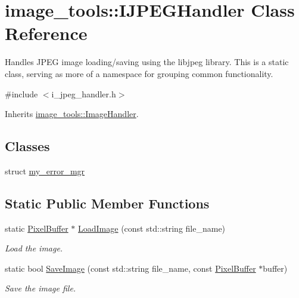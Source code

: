 \hypertarget{classimage__tools_1_1IJPEGHandler}{}\section{image\+\_\+tools\+:\+:I\+J\+P\+E\+G\+Handler Class Reference}
\label{classimage__tools_1_1IJPEGHandler}


Handles J\+P\+EG image loading/saving using the libjpeg library. This is a static class, serving as more of a namespace for grouping common functionality.  




{\ttfamily \#include $<$i\+\_\+jpeg\+\_\+handler.\+h$>$}



Inherits \hyperlink{classimage__tools_1_1ImageHandler}{image\+\_\+tools\+::\+Image\+Handler}.

\subsection*{Classes}
\begin{DoxyCompactItemize}
\item 
struct \hyperlink{structimage__tools_1_1IJPEGHandler_1_1my__error__mgr}{my\+\_\+error\+\_\+mgr}
\end{DoxyCompactItemize}
\subsection*{Static Public Member Functions}
\begin{DoxyCompactItemize}
\item 
static \hyperlink{classimage__tools_1_1PixelBuffer}{Pixel\+Buffer} $\ast$ \hyperlink{classimage__tools_1_1IJPEGHandler_a8230699e4d2722b59026ce5cd61de947}{Load\+Image} (const std\+::string file\+\_\+name)
\begin{DoxyCompactList}\small\item\em Load the image. \end{DoxyCompactList}\item 
static bool \hyperlink{classimage__tools_1_1IJPEGHandler_a9f4e3b2a9a1551cfeac6e43a59ead011}{Save\+Image} (const std\+::string file\+\_\+name, const \hyperlink{classimage__tools_1_1PixelBuffer}{Pixel\+Buffer} $\ast$buffer)
\begin{DoxyCompactList}\small\item\em Save the image file. \end{DoxyCompactList}\end{DoxyCompactItemize}
